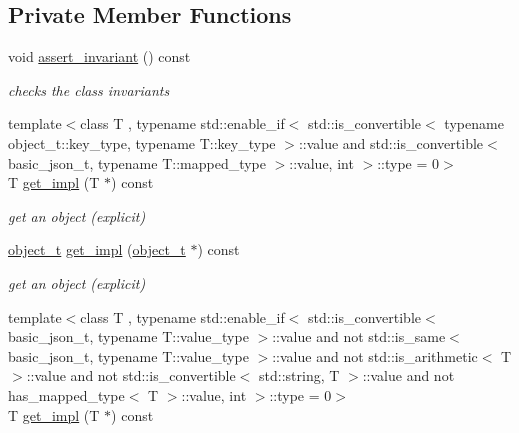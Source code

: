 \subsection*{Private Member Functions}
\begin{DoxyCompactItemize}
\item 
void \hyperlink{classnlohmann_1_1basic__json_a7cb7bffdb2c9b92a68a1feeda36204f6}{assert\+\_\+invariant} () const
\begin{DoxyCompactList}\small\item\em checks the class invariants \end{DoxyCompactList}\item 
\hypertarget{classnlohmann_1_1basic__json_a36a2849d28e6e2aba2cc4d1c962e4682}{}\label{classnlohmann_1_1basic__json_a36a2849d28e6e2aba2cc4d1c962e4682} 
{\footnotesize template$<$class T , typename std\+::enable\+\_\+if$<$ std\+::is\+\_\+convertible$<$ typename object\+\_\+t\+::key\+\_\+type, typename T\+::key\+\_\+type $>$\+::value and std\+::is\+\_\+convertible$<$ basic\+\_\+json\+\_\+t, typename T\+::mapped\+\_\+type $>$\+::value, int $>$\+::type  = 0$>$ }\\T \hyperlink{classnlohmann_1_1basic__json_a36a2849d28e6e2aba2cc4d1c962e4682}{get\+\_\+impl} (T $\ast$) const
\begin{DoxyCompactList}\small\item\em get an object (explicit) \end{DoxyCompactList}\item 
\hypertarget{classnlohmann_1_1basic__json_a06fb3bc426f2810044b0a9128060f403}{}\label{classnlohmann_1_1basic__json_a06fb3bc426f2810044b0a9128060f403} 
\hyperlink{classnlohmann_1_1basic__json_a0ac9894c9de8dc551cf2e5f1c605537f}{object\+\_\+t} \hyperlink{classnlohmann_1_1basic__json_a06fb3bc426f2810044b0a9128060f403}{get\+\_\+impl} (\hyperlink{classnlohmann_1_1basic__json_a0ac9894c9de8dc551cf2e5f1c605537f}{object\+\_\+t} $\ast$) const
\begin{DoxyCompactList}\small\item\em get an object (explicit) \end{DoxyCompactList}\item 
\hypertarget{classnlohmann_1_1basic__json_a36a2849d28e6e2aba2cc4d1c962e4682}{}\label{classnlohmann_1_1basic__json_a36a2849d28e6e2aba2cc4d1c962e4682} 
{\footnotesize template$<$class T , typename std\+::enable\+\_\+if$<$ std\+::is\+\_\+convertible$<$ basic\+\_\+json\+\_\+t, typename T\+::value\+\_\+type $>$\+::value and not std\+::is\+\_\+same$<$ basic\+\_\+json\+\_\+t, typename T\+::value\+\_\+type $>$\+::value and not std\+::is\+\_\+arithmetic$<$ T $>$\+::value and not std\+::is\+\_\+convertible$<$ std\+::string, T $>$\+::value and not has\+\_\+mapped\+\_\+type$<$ T $>$\+::value, int $>$\+::type  = 0$>$ }\\T \hyperlink{classnlohmann_1_1basic__json_a36a2849d28e6e2aba2cc4d1c962e4682}{get\+\_\+impl} (T $\ast$) const

\end{DoxyCompactItemize}
